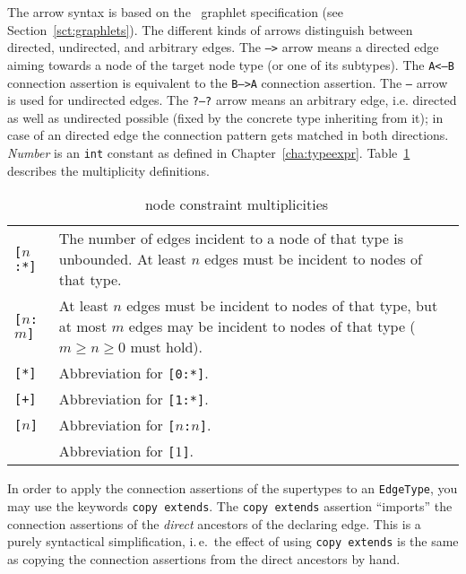 The arrow syntax is based on the \GrG\ graphlet specification (see Section~\ref{sct:graphlets}).
The different kinds of arrows distinguish between directed, undirected, and arbitrary edges.
The \texttt{-->} arrow means a directed edge aiming towards a node of the target node type (or one of its subtypes).
The \texttt{A<--B} connection assertion is equivalent to the \texttt{B-->A} connection assertion.
The \texttt{--} arrow is used for undirected edges.
The \texttt{?--?} arrow means an arbitrary edge, i.e. directed as well as undirected possible (fixed by the concrete type inheriting from it); in case of an directed edge the connection pattern gets matched in both directions.
\emph{Number} is an \texttt{int} constant as defined in Chapter~\ref{cha:typeexpr}. 
Table~\ref{multiplicities} describes the multiplicity definitions. 

\begin{table}[htbp]
\begin{tabularx}{\linewidth}{|l|X|}\hline
	\texttt{[$n$:*]} & The number of edges incident to a node of that type is unbounded. At least $n$ edges must be incident to nodes of that type.\\ 
	\texttt{[$n$:$m$]} & At least $n$ edges must be incident to nodes of that type, but at most $m$ edges may be incident to nodes of that type ($m \geq n \geq 0$ must hold).\\
	\texttt{[*]} & Abbreviation for \texttt{[0:*]}.\\
	\texttt{[+]} & Abbreviation for \texttt{[1:*]}.\\
	\texttt{[$n$]} & Abbreviation for \texttt{[$n$:$n$]}.\\
	               & Abbreviation for \texttt{[$1$]}. \\ \hline
\end{tabularx}
\caption{\GrG\ node constraint multiplicities}
\label{multiplicities}
\end{table}

In order to apply the connection assertions of the supertypes to an \texttt{EdgeType}, you may use the keywords \texttt{copy extends}.
The \texttt{copy extends} assertion ``imports'' the connection assertions of the \emph{direct} ancestors of the declaring edge.
This is a purely syntactical simplification, i.\,e.\ the effect of using \texttt{copy extends} is the same as copying the connection assertions from the direct ancestors by hand.


